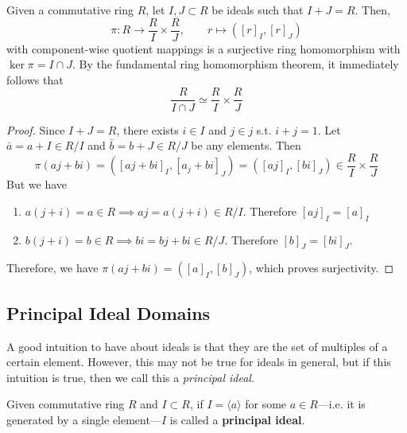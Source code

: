   \begin{corollary}
    Given a commutative ring $R$, let $I, J \subset R$ be ideals such that $I + J = R$. Then, 
    \begin{equation}
      \pi: R \to \frac{R}{I} \times \frac{R}{J}, \qquad r \mapsto ([r]_I, [r]_J)
    \end{equation}
    with component-wise quotient mappings is a surjective ring homomorphism with $\ker{\pi} = I \cap J$. By the fundamental ring homomorphism theorem, it immediately follows that 
    \begin{equation}
      \frac{R}{I \cap J} \simeq \frac{R}{I} \times \frac{R}{J}
    \end{equation}
  \end{corollary}
  \begin{proof}
    Since $I + J = R$, there exists $i \in I$ and $j \in j$ s.t. $i + j = 1$. Let $\bar{a} = a + I \in R/I$ and $\bar{b} = b + J \in R/J$ be any elements. Then 
    \begin{equation}
      \pi(aj + bi) = ([aj + bi]_I, [a_j + bi]_J) = ([aj]_I, [bi]_J) \in \frac{R}{I} \times \frac{R}{J}
    \end{equation} 
    But we have 
    \begin{enumerate}
      \item $a(j + i) = a \in R \implies aj = a(j + i) \in R/I$. Therefore $[aj]_I = [a]_I$ 
      \item $b(j + i) = b \in R \implies bi = bj + bi \in R/J$. Therefore $[b]_J = [bi]_J$. 
    \end{enumerate}
    Therefore, we have $\pi(aj + bi) = ([a]_I, [b]_J)$, which proves surjectivity. 
  \end{proof}

  \begin{example}
    
  \end{example}

\subsection{Principal Ideal Domains}

  A good intuition to have about ideals is that they are the set of multiples of a certain element. However, this may not be true for ideals in general, but if this intuition is true, then we call this a \textit{principal ideal}. 

  \begin{definition}
    Given commutative ring $R$ and $I \subset R$, if $I = \langle a \rangle$ for some $a \in R$---i.e. it is generated by a single element---$I$ is called a \textbf{principal ideal}. 
  \end{definition}

